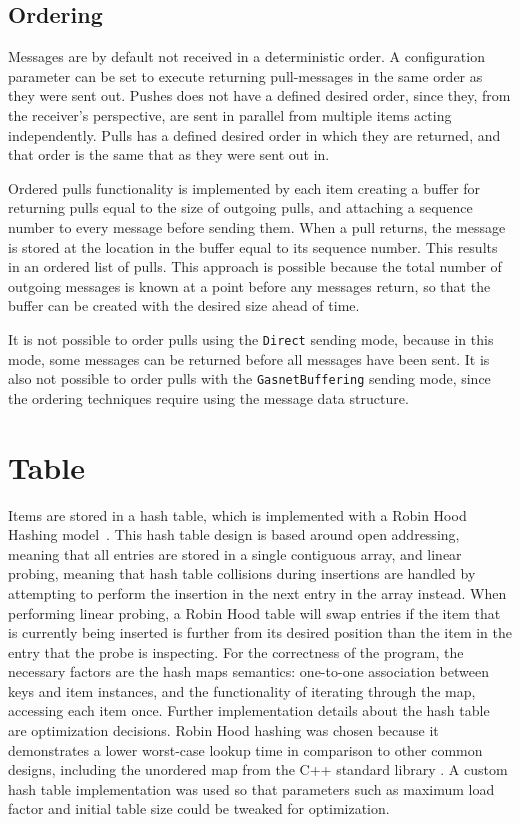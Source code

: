 \documentclass{uit-report}
\begin{document}
\subsection{Ordering}
Messages are by default not received in a deterministic order. A configuration parameter can be set to execute returning pull-messages in the same order as they were sent out. Pushes does not have a defined desired order, since they, from the receiver's perspective, are sent in parallel from multiple items acting independently. Pulls has a defined desired order in which they are returned, and that order is the same that as they were sent out in. 

Ordered pulls functionality is implemented by each item creating a buffer for returning pulls equal to the size of outgoing pulls, and attaching a sequence number to every message before sending them. When a pull returns, the message is stored at the location in the buffer equal to its sequence number. This results in an ordered list of pulls. This approach is possible because the total number of outgoing messages is known at a point before any messages return, so that the buffer can be created with the desired size ahead of time.

It is not possible to order pulls using the \texttt{Direct} sending mode, because in this mode, some messages can be returned before all messages have been sent. It is also not possible to order pulls with the \texttt{GasnetBuffering} sending mode, since the ordering techniques require using the message data structure. 


\section{Table}
Items are stored in a hash table, which is implemented with a Robin Hood Hashing model~\cite{robinhash}. This hash table design is based around open addressing, meaning that all entries are stored in a single contiguous array, and linear probing, meaning that hash table collisions during insertions are handled by attempting to perform the insertion in the next entry in the array instead. When performing linear probing, a Robin Hood table will swap entries if the item that is currently being inserted is further from its desired position than the item in the entry that the probe is inspecting.
\newpage
For the correctness of the program, the necessary factors are the hash maps semantics: one-to-one association between keys and item instances, and the functionality of iterating through the map, accessing each item once. Further implementation details about the hash table are optimization decisions. Robin Hood hashing was chosen because it demonstrates a lower worst-case lookup time in comparison to other common designs, including the unordered map from the C++ standard library  \cite{hashbenchmark}. A custom hash table implementation was used so that parameters such as maximum load factor and initial table size could be tweaked for optimization.
\end{document}
